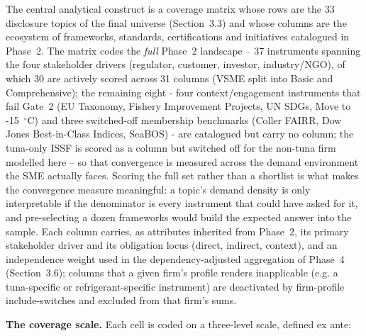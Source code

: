 \documentclass[
]{article}
\begin{document}
The central analytical construct is a coverage matrix whose rows are the
33 disclosure topics of the final universe (Section~3.3) and whose
columns are the ecosystem of frameworks, standards, certifications and
initiatives catalogued in Phase~2. The matrix codes the \emph{full} Phase~2
landscape -- 37 instruments spanning the four stakeholder
drivers (regulator, customer, investor, industry/NGO), of which 30 are
actively scored across 31 columns (VSME split into Basic and
Comprehensive); the remaining eight - four context/engagement
instruments that fail Gate~2 (EU Taxonomy, Fishery Improvement Projects,
UN SDGs, Move to -15~$^{\circ}$C) and three switched-off membership
benchmarks (Coller FAIRR, Dow Jones Best-in-Class Indices, SeaBOS) - are
catalogued but carry no column; the tuna-only ISSF is scored as a column
but switched off for the non-tuna firm modelled here
-- so that convergence is measured across the demand environment the SME
actually faces. Scoring the full set rather than a shortlist is what makes the
convergence measure meaningful: a topic's demand density is only interpretable
if the denominator is every instrument that could have asked for it, and
pre-selecting a dozen frameworks would build the expected answer into the
sample. Each column carries, as attributes inherited from
Phase~2, its primary stakeholder driver and its obligation locus (direct,
indirect, context), and an independence weight used in the
dependency-adjusted aggregation of Phase~4 (Section~3.6); columns that a
given firm's profile renders inapplicable (e.g. a tuna-specific or
refrigerant-specific instrument) are deactivated by firm-profile
include-switches and excluded from that firm's sums.

\textbf{The coverage scale.} Each cell is coded on a three-level scale,
defined ex ante:
\end{document}

